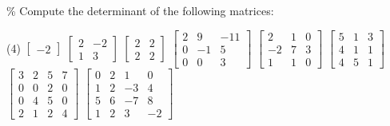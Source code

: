 \documentclass{ximera}
\begin{document}
\begin{exercise}\%
    Compute the determinant of the following matrices:
    \begin{tasks}(4)
        \task
        $\begin{bmatrix}
            -2
        \end{bmatrix}$
        \task
        $\begin{bmatrix}
            2 & -2 \\
            1 & 3
        \end{bmatrix}$
        \task
        $\begin{bmatrix}
            2 & 2 \\
            2 & 2
        \end{bmatrix}$
        \task
        $\begin{bmatrix}
            2 & 9 & -11 \\
            0 & -1 & 5 \\
            0 & 0 & 3
        \end{bmatrix}$
        \task
        $\begin{bmatrix}
            2 & 1 & 0 \\
            -2 & 7 & 3 \\
            1 & 1 & 0
        \end{bmatrix}$
        \task
        $\begin{bmatrix}
            5 & 1 & 3 \\
            4 & 1 & 1 \\
            4 & 5 & 1
        \end{bmatrix}$
        \task
        $\begin{bmatrix}
            3 & 2 & 5 & 7 \\
            0 & 0 & 2 & 0 \\
            0 & 4 & 5 & 0 \\
            2 & 1 & 2 & 4
        \end{bmatrix}$
        \task
        $\begin{bmatrix}
             0 &  2 &  1 &  0 \\
             1 &  2 & -3 &  4 \\
             5 &  6 & -7 &  8 \\
             1 &  2 &  3 & -2
        \end{bmatrix}$
    \end{tasks}
\end{exercise}
\end{document}
